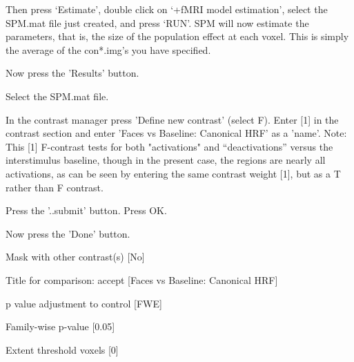 Then press `Estimate', double click on `+fMRI model estimation', select the SPM.mat file just created, and press `RUN'.
SPM will now estimate the parameters, that is, the size of the population effect at each voxel. This is simply the average of the con*.img's you have specified.

\bi
\item{Now press the 'Results' button.}
\item{Select the SPM.mat file.}
\item{In the contrast manager press 'Define new contrast' (select F). Enter [1] in the contrast section and enter 'Faces vs Baseline: Canonical HRF' as a 'name'. Note: This [1] F-contrast tests for both "activations" and ``deactivations'' versus the interstimulus baseline, though in the present case, the regions are nearly all activations, as can be seen by entering the same contrast weight [1], but as a T rather than F contrast.}
\item{Press the '..submit' button. Press OK.}
\item{Now press the 'Done' button.}
\item{Mask with other contrast(s) [No]}
\item{Title for comparison: accept [Faces vs Baseline: Canonical HRF]}
\item{p value adjustment to control [FWE]}
\item{Family-wise p-value [0.05]}
\item{Extent threshold {voxels} [0]}
\ei

